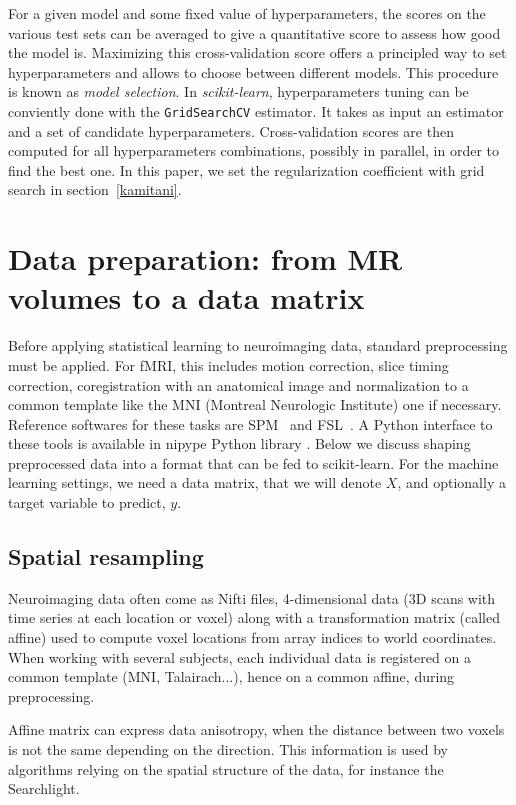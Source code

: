 \documentclass{frontiersSCNS} %
\begin{document}
For a given model and some fixed value of hyperparameters, the scores
on the various test sets can be averaged to give a quantitative score
to assess how good the model is. Maximizing this cross-validation score offers
a principled way to set hyperparameters and allows to choose between
different models. This procedure is known as \emph{model selection}.
%
In {\em scikit-learn}, hyperparameters tuning can be conviently done with the
\texttt{GridSearchCV} estimator. It takes as input an estimator and
a set of candidate hyperparameters. Cross-validation scores are then
computed for all hyperparameters combinations, possibly in parallel,
in order to find the best one. In this paper, we set the regularization
coefficient with grid search in section~\ref{kamitani}.

\section{Data preparation: from MR volumes to a data matrix}
\label{data_preparation}
Before applying statistical learning to neuroimaging data, standard
preprocessing must be applied. For fMRI, this includes motion
correction, slice timing correction, coregistration with an anatomical image and normalization to a common
template like the MNI (Montreal Neurologic Institute) one if necessary.
Reference softwares for these tasks are
SPM~\citep{friston2007} and
FSL~\citep{smith2004}. A Python
interface to these tools is available in nipype Python library
\citep{gorgolewski2011}. Below we discuss shaping preprocessed data into
a format that can be fed to scikit-learn. For the machine learning
settings, we need a data matrix, that we will denote $X$, and optionally a
target variable to predict, $y$.

\subsection{Spatial resampling}
\label{resampling}

Neuroimaging data often come as Nifti files, 4-dimensional data (3D scans
with time series at each location or voxel) along with a
transformation matrix (called affine) used to compute voxel locations
from array indices to world coordinates. When working with several subjects,
each individual data is registered on a common template (MNI, Talairach...),
hence on a common affine, during preprocessing.

Affine matrix can express data
anisotropy, when the distance between two voxels is not the same
depending on the direction. This information is used by algorithms
relying on the spatial structure of the data, for instance the
Searchlight.
\end{document}

